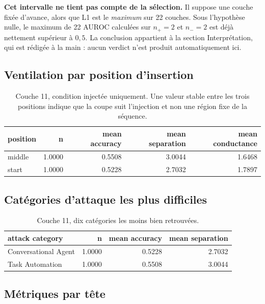 \documentclass[11pt,a4paper]{article}
\begin{document}
\textbf{Cet intervalle ne tient pas compte de la sélection.} Il suppose une
couche fixée d'avance, alors que L1 est le \emph{maximum} sur
22 couches. Sous l'hypothèse nulle, le maximum de
22 AUROC calculées sur $n_+ = 2$ et $n_- = 2$ est déjà
nettement supérieur à $0{,}5$. La conclusion appartient à la section
Interprétation, qui est rédigée à la main : aucun verdict n'est produit
automatiquement ici.


\subsection{Ventilation par position d'insertion}

\begin{table}[htbp]
\centering
\small
\begin{tabular}{lrrrr}
\hline
position & n & mean accuracy & mean separation & mean conductance \\
\hline
middle & 1.0000 & 0.5508 & 3.0044 & 1.6468 \\
start & 1.0000 & 0.5228 & 2.7032 & 1.7897 \\
\hline
\end{tabular}
\caption{Couche 11, condition injectée uniquement. Une valeur stable entre les trois positions indique que la coupe suit l'injection et non une région fixe de la séquence.}
\label{tab:positions}
\end{table}

\subsection{Catégories d'attaque les plus difficiles}

\begin{table}[htbp]
\centering
\small
\begin{tabular}{lrrr}
\hline
attack category & n & mean accuracy & mean separation \\
\hline
Conversational Agent & 1.0000 & 0.5228 & 2.7032 \\
Task Automation & 1.0000 & 0.5508 & 3.0044 \\
\hline
\end{tabular}
\caption{Couche 11, dix catégories les moins bien retrouvées.}
\label{tab:categories}
\end{table}

\subsection{Métriques par tête}
\end{document}
